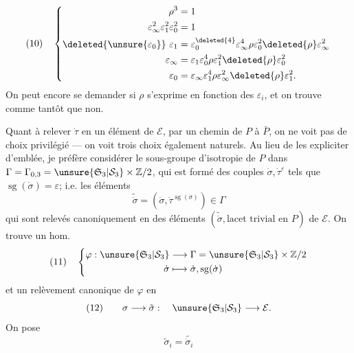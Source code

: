 \[
(10)\quad\left\{\begin{aligned}
\rho^3&=1\\
\varepsilon_\infty^2\varepsilon_1^2\varepsilon_0^2&=1\\
\deleted{\unsure{\varepsilon_0}}\ \varepsilon_1&=\varepsilon_0^{\deleted{4}}\varepsilon_\infty^4\rho\varepsilon_0^2\deleted{\rho}\varepsilon_\infty^2\\
\varepsilon_\infty&=\varepsilon_1\varepsilon_0^4\rho\varepsilon_1^2\deleted{\rho}\varepsilon_0^2\\
\varepsilon_0&=\varepsilon_\infty\varepsilon_1^4\rho\varepsilon_\infty^2\deleted{\rho}\varepsilon_1^2.
\end{aligned}\right.
\]
On peut encore se demander si $\rho$ s'exprime en fonction des $\varepsilon_i$, et on trouve comme tantôt que non.

Quant à relever $\dot\tau$ en un élément de $\mathcal E$, par un chemin de $P$ à $\bar P$, on ne voit pas de choix privilégié --- on voit trois choix également naturels. Au lieu de les expliciter d'emblée, je préfère considérer le sous-groupe d'isotropie de $P$ dans $\Gamma=\Gamma_{0,3}=\unsure{\mathfrak S_3|\mathcal S_3}\times\mathbb Z/2$, qui est formé des couples $\dot\sigma,\dot\tau^\varepsilon$ tels que $\operatorname{sg}(\dot\sigma)=\varepsilon$;  i.e. les éléments
\[
\widetilde{\dot\sigma}=(\dot\sigma,\dot\tau^{\operatorname{sg}(\dot\sigma)})\in\Gamma
\]
qui sont relevés canoniquement en des éléments $(\widetilde{\dot\sigma},\text{lacet trivial en }P)$ de $\mathcal E$. On trouve un hom.
\[
(11)\quad\left\{\begin{aligned}
\varphi:\unsure{\mathfrak S_3|\mathcal S_3}&\longrightarrow\Gamma=\unsure{\mathfrak S_3|\mathcal S_3}\times\mathbb Z/2\\
\dot\sigma&\longmapsto\dot\sigma,\operatorname{sg}(\dot\sigma)
\end{aligned}\right.
\]
et un relèvement canonique de $\varphi$ en
\[
(12)\qquad\sigma\longrightarrow\tilde\sigma:\quad\unsure{\mathfrak S_3|\mathcal S_3}\longrightarrow\mathcal E.
\]
On pose
\[
\tilde\sigma_i=\widetilde{\dot\sigma_i}
\]
